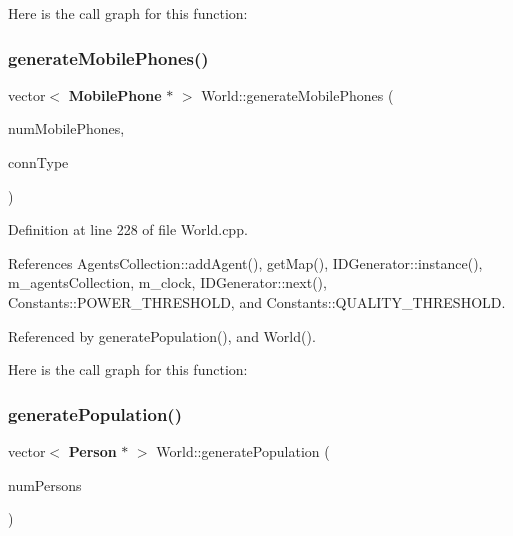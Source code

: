 Here is the call graph for this function\+:
\mbox{\label{class_world_a478f62a296d9a7b6587c116aab6563c6}} 
\subsubsection{generate\+Mobile\+Phones()}
{\footnotesize\ttfamily vector$<$ \textbf{ Mobile\+Phone} $\ast$ $>$ World\+::generate\+Mobile\+Phones (\begin{DoxyParamCaption}\item[{int}]{num\+Mobile\+Phones,  }\item[{\textbf{ Holdable\+Agent\+::\+C\+O\+N\+N\+E\+C\+T\+I\+O\+N\+\_\+\+T\+Y\+PE}}]{conn\+Type }\end{DoxyParamCaption})\hspace{0.3cm}{\ttfamily [private]}}



Definition at line 228 of file World.\+cpp.



References Agents\+Collection\+::add\+Agent(), get\+Map(), I\+D\+Generator\+::instance(), m\+\_\+agents\+Collection, m\+\_\+clock, I\+D\+Generator\+::next(), Constants\+::\+P\+O\+W\+E\+R\+\_\+\+T\+H\+R\+E\+S\+H\+O\+LD, and Constants\+::\+Q\+U\+A\+L\+I\+T\+Y\+\_\+\+T\+H\+R\+E\+S\+H\+O\+LD.



Referenced by generate\+Population(), and World().

Here is the call graph for this function\+:
\mbox{\label{class_world_a76bc2ffba54afefbb84b2f6fc781b629}} 
\subsubsection{generate\+Population()\hspace{0.1cm}{\footnotesize\ttfamily [1/2]}}
{\footnotesize\ttfamily vector$<$ \textbf{ Person} $\ast$ $>$ World\+::generate\+Population (\begin{DoxyParamCaption}\item[{unsigned long}]{num\+Persons }\end{DoxyParamCaption})\hspace{0.3cm}{\ttfamily [private]}}



